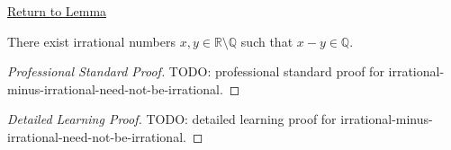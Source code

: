 \newpage
{}
\label{prf:irrational-minus-irrational-need-not-be-irrational}

\begin{remark*}[Return]
\hyperref[lem:irrational-minus-irrational-need-not-be-irrational]{Return to Lemma}
\end{remark*}

\begin{lemma*}
There exist irrational numbers $x,y\in\mathbb{R}\setminus\mathbb{Q}$ such
that $x-y\in\mathbb{Q}$.
\end{lemma*}

\begin{proof}[Professional Standard Proof]
\LRAProofBodyStart
TODO: professional standard proof for irrational-minus-irrational-need-not-be-irrational.
\end{proof}

\begin{proof}[Detailed Learning Proof]
\LRAProofBodyStart
TODO: detailed learning proof for irrational-minus-irrational-need-not-be-irrational.
\end{proof}

\begin{remark*}
\end{remark*}

\NoLocalDependencies

\clearpage

